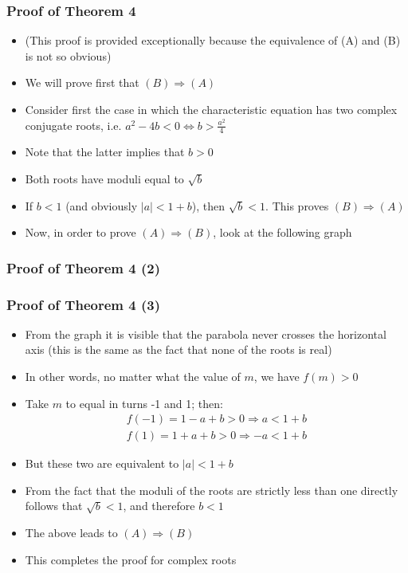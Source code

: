 \documentclass[10pt,usenames,dvipsnames]{beamer}
\theoremstyle{plain}
\theoremstyle{definition}
\begin{document}
\begin{frame}[fragile]
\frametitle{Proof of Theorem 4}
\begin{itemize}
	\item (This proof is provided exceptionally because the equivalence of (A) and (B) is not so obvious)
	\item We will prove first that $(B) \Rightarrow (A)$
	\item Consider first the case in which the characteristic equation has two complex conjugate roots, i.e. $\displaystyle a^2 - 4b < 0 \Leftrightarrow b > \frac{a^{2}}{4}$
	\item Note that the latter implies that $b > 0$
	\item Both roots have moduli equal to $\sqrt{b}$
	\item If $b < 1$ (and obviously $|a| < 1 + b$), then $\sqrt{b} < 1$. This proves $(B) \Rightarrow (A)$
	\item Now, in order to prove $(A) \Rightarrow (B)$, look at the following graph
\end{itemize}
\end{frame}

\begin{frame}[fragile]
\frametitle{Proof of Theorem 4 (2)}
\begin{center}
\end{center} 
\end{frame}

\begin{frame}[fragile]
\frametitle{Proof of Theorem 4 (3)}
\begin{itemize}
	\item From the graph it is visible that the parabola never crosses the horizontal axis (this is the same as the fact that none of the roots is real)
	\item In other words, no matter what the value of $m$, we have $f(m) > 0$
	\item Take $m$ to equal in turns -1 and 1; then:
	\[
		\begin{array}{lcl}
			f(-1) = 1 - a + b > 0 \Rightarrow a < 1 + b\\
			f(1) = 1 + a + b > 0 \Rightarrow -a < 1 + b
		\end{array}
	\]
	\item But these two are equivalent to $|a| < 1 + b$
	\item From the fact that the moduli of the roots are strictly less than one directly follows that $\sqrt{b} < 1$, and therefore $b < 1$
	\item The above leads to $(A) \Rightarrow (B)$
	\item This completes the proof for complex roots
\end{itemize}
\end{frame}
\end{document}
